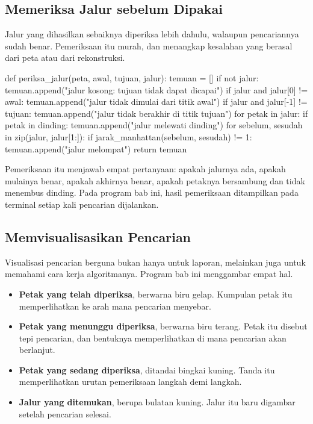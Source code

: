 \subsection{Memeriksa Jalur sebelum Dipakai}

Jalur yang dihasilkan sebaiknya diperiksa lebih dahulu, walaupun pencariannya
sudah benar. Pemeriksaan itu murah, dan menangkap kesalahan yang berasal dari
peta atau dari rekonstruksi.

\begin{kodekeluaran}
def periksa_jalur(peta, awal, tujuan, jalur):
    temuan = []
    if not jalur:
        temuan.append("jalur kosong: tujuan tidak dapat dicapai")
    if jalur and jalur[0] != awal:
        temuan.append("jalur tidak dimulai dari titik awal")
    if jalur and jalur[-1] != tujuan:
        temuan.append("jalur tidak berakhir di titik tujuan")
    for petak in jalur:
        if petak in dinding:
            temuan.append("jalur melewati dinding")
    for sebelum, sesudah in zip(jalur, jalur[1:]):
        if jarak_manhattan(sebelum, sesudah) != 1:
            temuan.append("jalur melompat")
    return temuan
\end{kodekeluaran}

Pemeriksaan itu menjawab empat pertanyaan: apakah jalurnya ada, apakah mulainya
benar, apakah akhirnya benar, apakah petaknya bersambung dan tidak menembus
dinding. Pada program bab ini, hasil pemeriksaan ditampilkan pada terminal
setiap kali pencarian dijalankan.

\subsection{Memvisualisasikan Pencarian}

Visualisasi pencarian berguna bukan hanya untuk laporan, melainkan juga untuk
memahami cara kerja algoritmanya. Program bab ini menggambar empat hal.

\begin{itemize}
  \item \textbf{Petak yang telah diperiksa}, berwarna biru gelap. Kumpulan
        petak itu memperlihatkan ke arah mana pencarian menyebar.
  \item \textbf{Petak yang menunggu diperiksa}, berwarna biru terang. Petak itu
        disebut tepi pencarian, dan bentuknya memperlihatkan di mana pencarian
        akan berlanjut.
  \item \textbf{Petak yang sedang diperiksa}, ditandai bingkai kuning. Tanda itu
        memperlihatkan urutan pemeriksaan langkah demi langkah.
  \item \textbf{Jalur yang ditemukan}, berupa bulatan kuning. Jalur itu baru
        digambar setelah pencarian selesai.
\end{itemize}


